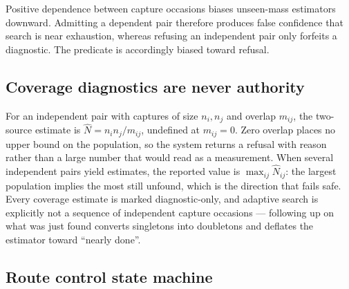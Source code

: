 \begin{proposition}
\label{prop:conservative}
Positive dependence between capture occasions biases unseen-mass estimators
downward. Admitting a dependent pair therefore produces false confidence that
search is near exhaustion, whereas refusing an independent pair only forfeits a
diagnostic. The predicate is accordingly biased toward refusal.
\end{proposition}

\subsection{Coverage diagnostics are never authority}

For an independent pair with captures of size $n_i, n_j$ and overlap $m_{ij}$,
the two-source estimate is $\hat{N} = n_i n_j / m_{ij}$, undefined at
$m_{ij}=0$. Zero overlap places no upper bound on the population, so the system
returns a refusal with reason rather than a large number that would read as a
measurement. When several independent pairs yield estimates, the reported value
is $\max_{ij} \hat{N}_{ij}$: the largest population implies the most still
unfound, which is the direction that fails safe. Every coverage estimate is
marked diagnostic-only, and adaptive search is explicitly not a sequence of
independent capture occasions --- following up on what was just found converts
singletons into doubletons and deflates the estimator toward ``nearly done''.

\subsection{Route control state machine}

